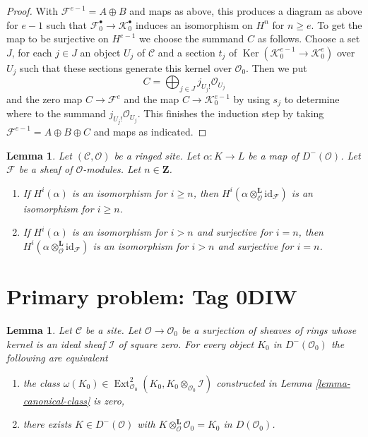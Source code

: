 \documentclass{amsart}
\theoremstyle{plain}
\newtheorem{lemma}[subsection]{Lemma}
\theoremstyle{definition}
\theoremstyle{remark}
\numberwithin{equation}{subsection}
\def\Ext{\mathop{\mathrm{Ext}}\nolimits}
\def\Ker{\mathop{\mathrm{Ker}}}
\begin{document}
\begin{proof}
\medskip\noindent
With $\mathcal{F}^{e - 1} = A \oplus B$ and maps as above,
this produces a diagram as above for $e - 1$ such that
$\mathcal{F}_0^\bullet \to \mathcal{K}_0^\bullet$
induces an isomorphism on $H^n$ for $n \geq e$.
To get the map to be surjective on $H^{e - 1}$ we choose
the summand $C$ as follows.
Choose a set $J$, for each $j \in J$ an object $U_j$ of $\mathcal{C}$
and a section $t_j$ of $\Ker(\mathcal{K}^{e - 1}_0 \to \mathcal{K}^e_0)$
over $U_j$ such that these sections generate this kernel over
$\mathcal{O}_0$. Then we put
$$
C = \bigoplus\nolimits_{j \in J} j_{U_j!}\mathcal{O}_{U_j}
$$
and the zero map $C \to \mathcal{F}^e$ and the map
$C \to \mathcal{K}_0^{e - 1}$ by using $s_j$ to determine where to the summand
$j_{U_j!}\mathcal{O}_{U_j}$. This finishes the induction step
by taking $\mathcal{F}^{e - 1} = A \oplus B \oplus C$ and
maps as indicated.
\end{proof}


\begin{lemma}
\label{lemma-induced-map}
Let $(\mathcal{C}, \mathcal{O})$ be a ringed site.
Let $\alpha : K \to L$ be a map of $D^-(\mathcal{O})$.
Let $\mathcal{F}$ be a sheaf of $\mathcal{O}$-modules.
Let $n \in \mathbf{Z}$.
\begin{enumerate}
\item If $H^i(\alpha)$ is an isomorphism for $i \geq n$,
then $H^i(\alpha \otimes_\mathcal{O}^\mathbf{L} \text{id}_\mathcal{F})$
is an isomorphism for $i \geq n$.
\item If $H^i(\alpha)$ is an isomorphism for $i > n$ 
and surjective for $i = n$,
then $H^i(\alpha \otimes_\mathcal{O}^\mathbf{L} \text{id}_\mathcal{F})$
is an isomorphism for $i > n$ and surjective for $i = n$.
\end{enumerate}
\end{lemma}

\section*{Primary problem: Tag 0DIW}
\begin{lemma}
\label{lemma-canonical-class-obstruction}
Let $\mathcal{C}$ be a site. Let $\mathcal{O} \to \mathcal{O}_0$
be a surjection of sheaves of rings whose kernel is an ideal sheaf
$\mathcal{I}$ of square zero. For every object
$K_0$ in $D^-(\mathcal{O}_0)$ the following are equivalent
\begin{enumerate}
\item  the class
$\omega(K_0) \in
\Ext^2_{\mathcal{O}_0}(K_0, K_0 \otimes_{\mathcal{O}_0} \mathcal{I})$
constructed in Lemma \ref{lemma-canonical-class} is zero,
\item there exists $K \in D^-(\mathcal{O})$ with
$K \otimes_\mathcal{O}^\mathbf{L} \mathcal{O}_0 = K_0$
in $D(\mathcal{O}_0)$.
\end{enumerate}
\end{lemma}
\end{document}
